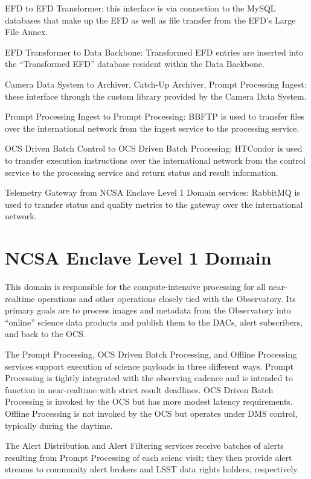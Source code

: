 \documentclass[DM,lsstdraft,toc]{lsstdoc}
\begin{document}
EFD to EFD Transformer: this interface is via connection to the MySQL
databases that make up the EFD as well as file transfer from the EFD's
Large File Annex.

EFD Transformer to Data Backbone: Transformed EFD entries are inserted
into the ``Transformed EFD'' database resident within the Data Backbone.

Camera Data System to Archiver, Catch-Up Archiver, Prompt Processing
Ingest: these interface through the custom library provided by the
Camera Data System.

Prompt Processing Ingest to Prompt Processing: BBFTP is used to transfer
files over the international network from the ingest service to the
processing service.

OCS Driven Batch Control to OCS Driven Batch Processing: HTCondor is
used to transfer execution instructions over the international network
from the control service to the processing service and return status and
result information.

Telemetry Gateway from NCSA Enclave Level 1 Domain services: RabbitMQ is
used to transfer status and quality metrics to the gateway over the
international network.

\section{NCSA Enclave Level 1 Domain}\label{ncsa-enclave-level-1-domain}

This domain is responsible for the compute-intensive processing for all
near-realtime operations and other operations closely tied with the
Observatory. Its primary goals are to process images and metadata from
the Observatory into ``online'' science data products and publish them
to the DACs, alert subscribers, and back to the OCS.

The Prompt Processing, OCS Driven Batch Processing, and Offline
Processing services support execution of science payloads in three
different ways. Prompt Processing is tightly integrated with the
observing cadence and is intended to function in near-realtime with
strict result deadlines. OCS Driven Batch Processing is invoked by the
OCS but has more modest latency requirements. Offline Processing is not
invoked by the OCS but operates under DMS control, typically during the
daytime.

The Alert Distribution and Alert Filtering services receive batches of
alerts resulting from Prompt Processing of each scienc visit; they then
provide alert streams to community alert brokers and LSST data rights
holders, respectively.
\end{document}
